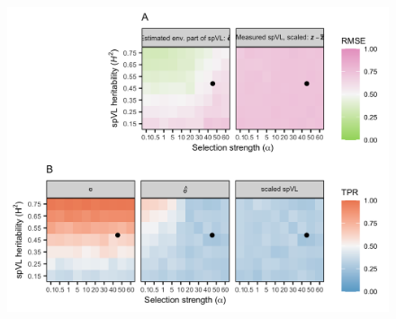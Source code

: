 \documentclass[11pt]{article} %
\begin{document}
\begin{linenumbers}
\begin{figure}[H]
	\begin{center}
		\includegraphics[width=\linewidth]{figures/simulation_results}

\end{center}
\end{figure}
\end{linenumbers}
\end{document}

